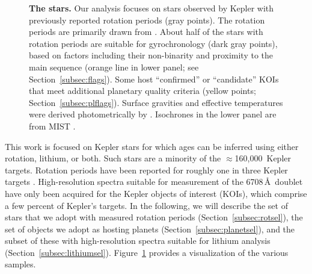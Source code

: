 \documentclass[11pt,twocolumn,tighten,linenumbers,trackchanges]{aastex63}
\newcommand{\nkeplerstars}{$\approx$160{,}000}
\begin{document}
\begin{figure}[!t]
\begin{center}
		\vspace{-0.3cm}
	\end{center}
	\vspace{-0.5cm}
  \caption{{\bf The stars.}  Our analysis focuses on stars observed by
  Kepler with previously reported rotation periods (gray points).  The
  rotation periods are primarily drawn from
  \citet{Santos_2019,Santos_2021}.  About half of the stars with
  rotation periods are suitable for gyrochronology (dark gray points),
  based on factors including their non-binarity and proximity to the
  main sequence (orange line in lower panel; see
  Section~\ref{subsec:flags}).  Some host ``confirmed'' or
  ``candidate'' KOIs that meet additional planetary quality criteria
  (yellow points; Section~\ref{subsec:plflags}).  Surface gravities
  and effective temperatures were derived photometrically by
  \citet{Berger_2020a_catalog}.  Isochrones in the lower panel are
  from MIST \citep{Choi_2016}.
	}
	\label{fig:stellarprops}
\end{figure}

This work is focused on Kepler stars for which ages can be inferred
using either rotation, lithium, or both.  Such stars are a minority of
the \nkeplerstars\ Kepler targets.  Rotation periods have been
reported for roughly one in three Kepler targets
\citep[e.g.][]{McQuillan_2014,Santos_2021}.  High-resolution spectra
suitable for measurement of the  6708\,\AA\ doublet have
only been acquired for the Kepler objects of interest (KOIs), which
comprise a few percent of Kepler's targets.  In the following, we will
describe the set of stars that we adopt with measured rotation periods
(Section~\ref{subsec:rotsel}), the set of objects we adopt as hosting
planets (Section~\ref{subsec:planetsel}), and the subset of these with
high-resolution spectra suitable for lithium analysis
(Section~\ref{subsec:lithiumsel}).  Figure~\ref{fig:stellarprops}
provides a visualization of the various samples.
\end{document}
